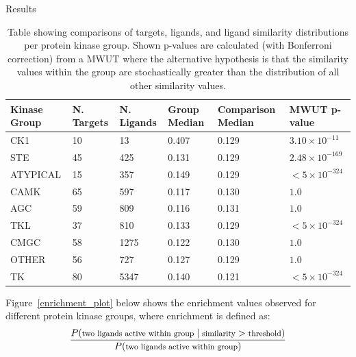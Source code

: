 \documentclass[final]{beamer}
\newlength{\colwidth}
\begin{document}
\begin{frame}[t]
\begin{columns}[t]
\begin{column}{\colwidth}
\begin{block}{Results}
    \begin{table}[!ht]
    \centering
    \footnotesize
    \begin{tabular}{l|l|l|l|l|l}
        \hline
        \textbf{Kinase Group} & \textbf{N. Targets} & \textbf{N. Ligands} & \textbf{Group Median} &\textbf{Comparison Median} & \textbf{MWUT p-value} \\ \hline
        CK1 & 10 & 13 & 0.407 & 0.129 & $3.10 \times 10^{-11}$ \\ \hline
        STE & 45 & 425 & 0.131 & 0.129 & $2.48 \times 10^{-169}$ \\ \hline
        ATYPICAL & 15 & 357 & 0.149 & 0.129 & $< 5 \times 10^{-324}$ \\ \hline
        CAMK & 65 & 597 & 0.117 & 0.130 & $1.0$ \\ \hline
        AGC & 59 & 809 & 0.116 & 0.131 & $1.0$ \\ \hline
        TKL & 37 & 810 & 0.133 & 0.129 & $< 5 \times 10^{-324}$ \\ \hline
        CMGC & 58 & 1275 & 0.122 & 0.130 & $1.0$ \\ \hline
        OTHER & 56 & 727 & 0.127 & 0.129 & $1.0$ \\ \hline
        TK & 80 & 5347 & 0.140 & 0.121 & $< 5 \times 10^{-324}$ \\ \hline
    \end{tabular}
    \caption{Table showing comparisons of targets, ligands, and ligand similarity distributions per protein kinase group. Shown p-values are calculated (with Bonferroni correction) from a MWUT where the alternative hypothesis is that the similarity values within the group are stochastically greater than the distribution of all other similarity values.}\label{results_table}
    \end{table}
    Figure~\ref{enrichment_plot} below shows the enrichment values observed for different protein kinase groups, where enrichment is defined as:
    \begin{equation*}
        \footnotesize
        \frac{P(\text{two ligands active within group} \; | \; \text{similarity} > \text{threshold})}{P(\text{two ligands active within group})}
    \end{equation*}
    \begin{figure}
        \centering

\end{figure}
\end{block}
\end{column}
\end{columns}
\end{frame}
\end{document}
